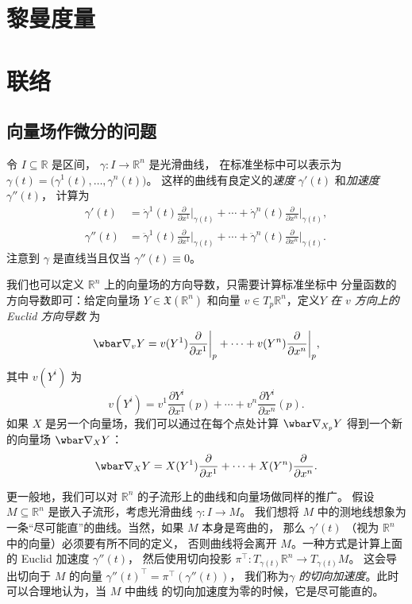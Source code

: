 \documentclass[fontset=none]{Notes}
\begin{document}
\frontmatter

\tableofcontents

\mainmatter

\chapter{黎曼度量}


\chapter{联络}

\section{向量场作微分的问题}

令 $I\subseteq \mathbb{R}$ 是区间， $\gamma:I\to \mathbb{R}^n$ 是光滑曲线，
在标准坐标中可以表示为 $\gamma(t)=\bigl(\gamma^1(t),\dots,\gamma^n(t)\bigr)$。
这样的曲线有良定义的\emph{速度} $\gamma'(t)$ 和\emph{加速度} $\gamma''(t)$，
计算为
\begin{align}\label{eq:velocity of curve in Euclid space}
  \gamma'(t)&=\dot{\gamma}^1(t)\frac{\partial}{\partial x^1}\bigg|_{\gamma(t)}
  +\cdots+\dot\gamma^n(t)\frac{\partial}{\partial x^n}\bigg|_{\gamma(t)},\\
  \gamma''(t)&=\ddot{\gamma}^1(t)\frac{\partial}{\partial x^1}\bigg|_{\gamma(t)}
  +\cdots+\ddot\gamma^n(t)\frac{\partial}{\partial x^n}\bigg|_{\gamma(t)}.
\end{align}
注意到 $\gamma$ 是直线当且仅当 $\gamma''(t)\equiv 0$。

我们也可以定义 $\mathbb{R}^n$ 上的向量场的方向导数，只需要计算标准坐标中
分量函数的方向导数即可：给定向量场 $Y\in \mathfrak{X}(\mathbb{R}^n)$
和向量 $v\in T_p \mathbb{R}^n$，定义\emph{$Y$ 在 $v$ 方向上的 Euclid 方向导数}
为
\[
  \wbar\nabla_v Y=v(Y^1)\frac{\partial}{\partial x^1}\bigg|_p
  + \cdots + v(Y^n)\frac{\partial}{\partial x^n}\bigg|_p,
\]
其中 $v(Y^i)$ 为
\[
  v(Y^i)=v^1\frac{\partial Y^i}{\partial x^1}(p)+\cdots +
  v^n\frac{\partial Y^i}{\partial x^n}(p).
\]
如果 $X$ 是另一个向量场，我们可以通过在每个点处计算 $\wbar\nabla_{X_p}Y$
得到一个新的向量场 $\wbar\nabla_XY$：
\begin{equation}
  \wbar\nabla_XY=X(Y^1)  \frac{\partial}{\partial x^1}+\cdots+
  X(Y^n)  \frac{\partial}{\partial x^n}.
\end{equation}

更一般地，我们可以对 $\mathbb{R}^n$ 的子流形上的曲线和向量场做同样的推广。
假设 $M\subseteq \mathbb{R}^n$ 是嵌入子流形，考虑光滑曲线 $\gamma:I\to M$。
我们想将 $M$ 中的测地线想象为一条“尽可能直”的曲线。当然，如果 $M$ 本身是弯曲的，
那么 $\gamma'(t)$ （视为 $\mathbb{R}^n$ 中的向量）必须要有所不同的定义，
否则曲线将会离开 $M$。一种方式是计算上面的 Euclid 加速度 $\gamma''(t)$，
然后使用切向投影 $\pi^\top:T_{\gamma(t)}\mathbb{R}^n\to T_{\gamma(t)}M$。
这会导出切向于 $M$ 的向量 $\gamma''(t)^\top=\pi^\top(\gamma''(t))$，
我们称为\emph{$\gamma$ 的切向加速度}。此时可以合理地认为，当 $M$ 中曲线
的切向加速度为零的时候，它是尽可能直的。
\end{document}
